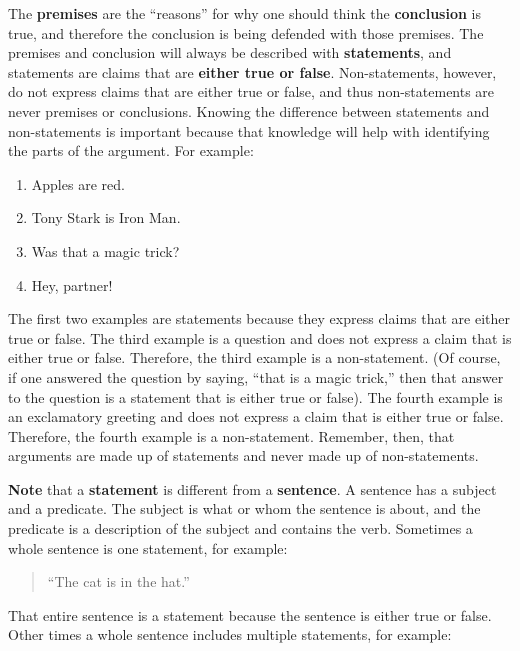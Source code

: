 \documentclass[
]{book}
\providecommand{\tightlist}{%
  \setlength{\itemsep}{0pt}\setlength{\parskip}{0pt}}
\begin{document}
The \textbf{premises} are the ``reasons'' for why one should think the \textbf{conclusion} is true, and therefore the conclusion is being defended with those premises. The premises and conclusion will always be described with \textbf{statements}, and statements are claims that are \textbf{either true or false}. Non-statements, however, do not express claims that are either true or false, and thus non-statements are never premises or conclusions. Knowing the difference between statements and non-statements is important because that knowledge will help with identifying the parts of the argument. For example:

\begin{enumerate}
\def\labelenumi{\arabic{enumi}.}
\tightlist
\item
  Apples are red.\\
\item
  Tony Stark is Iron Man.\\
\item
  Was that a magic trick?\\
\item
  Hey, partner!
\end{enumerate}

The first two examples are statements because they express claims that are either true or false. The third example is a question and does not express a claim that is either true or false. Therefore, the third example is a non-statement. (Of course, if one answered the question by saying, ``that is a magic trick,'' then that answer to the question is a statement that is either true or false). The fourth example is an exclamatory greeting and does not express a claim that is either true or false. Therefore, the fourth example is a non-statement. Remember, then, that arguments are made up of statements and never made up of non-statements.

\begin{caution}
\textbf{Note} that a \textbf{statement} is different from a \textbf{sentence}. A sentence has a subject and a predicate. The subject is what or whom the sentence is about, and the predicate is a description of the subject and contains the verb. Sometimes a whole sentence is one statement, for example:
\end{caution}

\begin{quote}
``The cat is in the hat.''
\end{quote}

That entire sentence is a statement because the sentence is either true or false. Other times a whole sentence includes multiple statements, for example:
\end{document}
